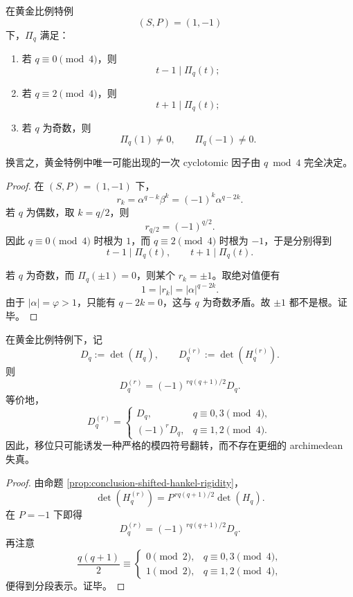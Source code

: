 \begin{theorem}\label{thm:conclusion-golden-lucas-linear-cyclotomic-gate}
在黄金比例特例
\[
(S,P)=(1,-1)
\]
下，\(\Pi_q\) 满足：
\begin{enumerate}
  \item 若 \(q\equiv 0\pmod 4\)，则
  \[
  t-1\mid \Pi_q(t);
  \]
  \item 若 \(q\equiv 2\pmod 4\)，则
  \[
  t+1\mid \Pi_q(t);
  \]
  \item 若 \(q\) 为奇数，则
  \[
  \Pi_q(1)\neq 0,\qquad \Pi_q(-1)\neq 0.
  \]
\end{enumerate}
换言之，黄金特例中唯一可能出现的一次 cyclotomic 因子由 \(q\bmod 4\) 完全决定。
\end{theorem}
\begin{proof}
在 \((S,P)=(1,-1)\) 下，
\[
r_k=\alpha^{q-k}\beta^k=(-1)^k\alpha^{q-2k}.
\]
若 \(q\) 为偶数，取 \(k=q/2\)，则
\[
r_{q/2}=(-1)^{q/2}.
\]
因此 \(q\equiv 0\pmod 4\) 时根为 \(1\)，而 \(q\equiv 2\pmod 4\) 时根为 \(-1\)，于是分别得到
\[
t-1\mid \Pi_q(t),
\qquad
t+1\mid \Pi_q(t).
\]

若 \(q\) 为奇数，而 \(\Pi_q(\pm 1)=0\)，则某个 \(r_k=\pm 1\)。取绝对值便有
\[
1=|r_k|=|\alpha|^{q-2k}.
\]
由于 \(|\alpha|=\varphi>1\)，只能有 \(q-2k=0\)，这与 \(q\) 为奇数矛盾。故 \(\pm 1\) 都不是根。证毕。
\end{proof}

\begin{corollary}\label{cor:conclusion-golden-shifted-hankel-mod4-sign-periodicity}
在黄金比例特例下，记
\[
D_q:=\det(H_q),
\qquad
D_q^{(r)}:=\det(H_q^{(r)}).
\]
则
\[
D_q^{(r)}=(-1)^{\,r q(q+1)/2}D_q.
\]
等价地，
\[
D_q^{(r)}=
\begin{cases}
D_q, & q\equiv 0,3\pmod 4,\\[2pt]
(-1)^rD_q, & q\equiv 1,2\pmod 4.
\end{cases}
\]
因此，移位只可能诱发一种严格的模四符号翻转，而不存在更细的 archimedean 失真。
\end{corollary}
\begin{proof}
由命题 \ref{prop:conclusion-shifted-hankel-rigidity}，
\[
\det(H_q^{(r)})
=
P^{\,r q(q+1)/2}\det(H_q).
\]
在 \(P=-1\) 下即得
\[
D_q^{(r)}=(-1)^{\,r q(q+1)/2}D_q.
\]
再注意
\[
\frac{q(q+1)}{2}\equiv
\begin{cases}
0 \pmod 2, & q\equiv 0,3\pmod 4,\\
1 \pmod 2, & q\equiv 1,2\pmod 4,
\end{cases}
\]
便得到分段表示。证毕。
\end{proof}

